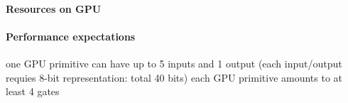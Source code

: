\documentclass{myproc}
\begin{document}
\small
\pagestyle{empty}


\paragraph{Resources on GPU}
\bit
\w 
\eit

\paragraph{Performance expectations}
\bit
\w {}
   \bit
   \w one GPU primitive can have up to 5 inputs and 1 output (each input/output
   requies 8-bit representation: total 40 bits)
   \w each GPU primitive amounts to at least 4 gates
   \eit
\eit
\end{document}
